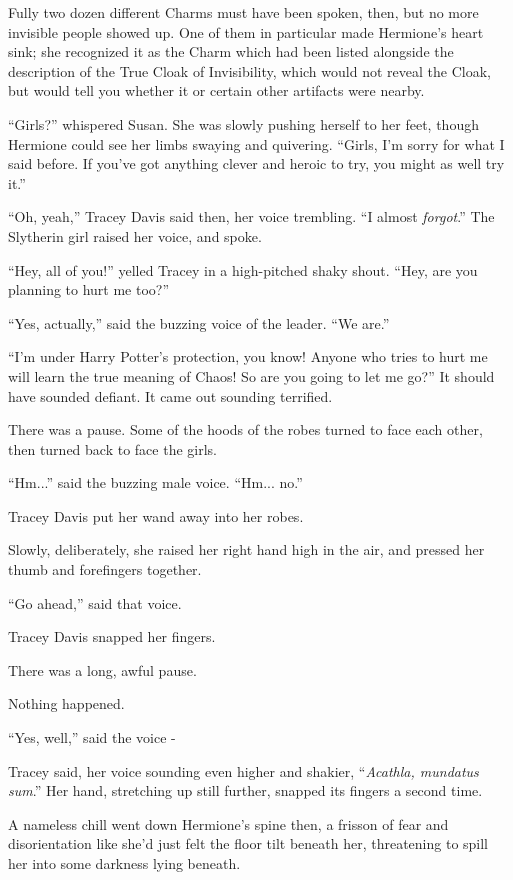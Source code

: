 Fully two dozen different Charms must have been spoken, then, but no more invisible people showed up. One of them in particular made Hermione's heart sink; she recognized it as the Charm which had been listed alongside the description of the True Cloak of Invisibility, which would not reveal the Cloak, but would tell you whether it or certain other artifacts were nearby.

``Girls?'' whispered Susan. She was slowly pushing herself to her feet, though Hermione could see her limbs swaying and quivering. ``Girls, I'm sorry for what I said before. If you've got anything clever and heroic to try, you might as well try it.''

``Oh, yeah,'' Tracey Davis said then, her voice trembling. ``I almost \emph{forgot}.'' The Slytherin girl raised her voice, and spoke.

``Hey, all of you!'' yelled Tracey in a high-pitched shaky shout. ``Hey, are you planning to hurt me too?''

``Yes, actually,'' said the buzzing voice of the leader. ``We are.''

``I'm under Harry Potter's protection, you know! Anyone who tries to hurt me will learn the true meaning of Chaos! So are you going to let me go?'' It should have sounded defiant. It came out sounding terrified.

There was a pause. Some of the hoods of the robes turned to face each other, then turned back to face the girls.

``Hm...'' said the buzzing male voice. ``Hm... no.''

Tracey Davis put her wand away into her robes.

Slowly, deliberately, she raised her right hand high in the air, and pressed her thumb and forefingers together.

``Go ahead,'' said that voice.

Tracey Davis snapped her fingers.

There was a long, awful pause.

Nothing happened.

``Yes, well,'' said the voice -

Tracey said, her voice sounding even higher and shakier, ``\emph{Acathla, mundatus sum}.'' Her hand, stretching up still further, snapped its fingers a second time.

A nameless chill went down Hermione's spine then, a frisson of fear and disorientation like she'd just felt the floor tilt beneath her, threatening to spill her into some darkness lying beneath.

